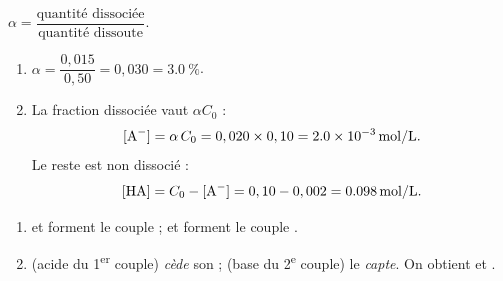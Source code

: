 \documentclass[11pt,a4paper]{article}
\begin{document}
\begin{corrige}
$\alpha = \dfrac{\text{quantité dissociée}}{\text{quantité dissoute}}$.
\begin{enumerate}[label=\alph*)]
  \item $\alpha = \dfrac{0,015}{0,50} = 0,030 = \qty{3,0}{\percent}$.
  \item La fraction dissociée vaut $\alpha C_0$ :
        \[ [\ce{A-}] = \alpha\,C_0 = 0,020 \times 0,10 = \qty{2,0e-3}{mol\per L}. \]
        Le reste est non dissocié :
        \[ [\ce{HA}] = C_0 - [\ce{A-}] = 0,10 - 0,002 = \qty{0,098}{mol\per L}. \]
\end{enumerate}
\end{corrige}

\begin{corrige}
\begin{enumerate}[label=\alph*)]
  \item {} et  forment le couple  ;  et  forment le
        couple .
  \item {} (acide du 1\textsuperscript{er} couple) \emph{cède} son  ;  (base du
        2\textsuperscript{e} couple) le \emph{capte}. On obtient  et .
\end{enumerate}
\end{corrige}
\end{document}
